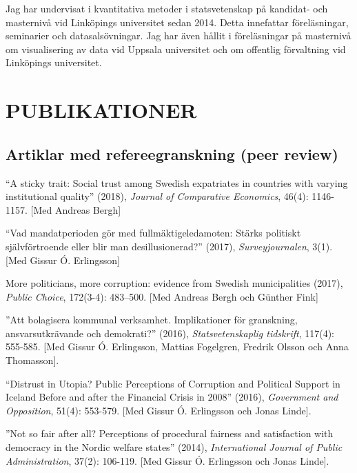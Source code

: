 \documentclass[11pt,]{article}
\begin{document}
Jag har undervisat i kvantitativa metoder i statsvetenskap på kandidat-
och masternivå vid Linköpings universitet sedan 2014. Detta innefattar
föreläsningar, seminarier och datasalsövningar. Jag har även hållit i
föreläsningar på masternivå om visualisering av data vid Uppsala
universitet och om offentlig förvaltning vid Linköpings universitet.

\hypertarget{publikationer}{%
\section{PUBLIKATIONER}\label{publikationer}}

\hypertarget{artiklar-med-refereegranskning-peer-review}{%
\subsection{\texorpdfstring{\textbf{Artiklar med refereegranskning (peer
review)}}{Artiklar med refereegranskning (peer review)}}\label{artiklar-med-refereegranskning-peer-review}}

``A sticky trait: Social trust among Swedish expatriates in countries
with varying institutional quality'' (2018), \emph{Journal of
Comparative Economics}, 46(4): 1146-1157. {[}Med Andreas Bergh{]}

``Vad mandatperioden gör med fullmäktigeledamoten: Stärks politiskt
självförtroende eller blir man desillusionerad?'' (2017),
\emph{Surveyjournalen}, 3(1). {[}Med Gissur Ó. Erlingsson{]}

More politicians, more corruption: evidence from Swedish municipalities
(2017), \emph{Public Choice}, 172(3-4): 483--500. {[}Med Andreas Bergh
och Günther Fink{]}

''Att bolagisera kommunal verksamhet. Implikationer för granskning,
ansvarsutkrävande och demokrati?'' (2016), \emph{Statsvetenskaplig
tidskrift}, 117(4): 555-585. {[}Med Gissur Ó. Erlingsson, Mattias
Fogelgren, Fredrik Olsson och Anna Thomasson{]}.

``Distrust in Utopia? Public Perceptions of Corruption and Political
Support in Iceland Before and after the Financial Crisis in 2008''
(2016), \emph{Government and Opposition}, 51(4): 553-579. {[}Med Gissur
Ó. Erlingsson och Jonas Linde{]}.

''Not so fair after all? Perceptions of procedural fairness and
satisfaction with democracy in the Nordic welfare states'' (2014),
\emph{International Journal of Public Administration}, 37(2): 106-119.
{[}Med Gissur Ó. Erlingsson och Jonas Linde{]}.
\end{document}
